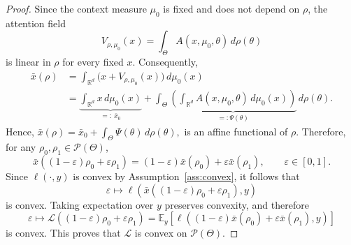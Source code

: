 \documentclass[11pt,a4wide]{article}
\theoremstyle{definition}
\newcommand{\R}{\mathbb{R}}
\newcommand{\Prob}{\mathcal{P}}
\begin{document}
\begin{proof}

Since the context measure $\mu_0$ is fixed and does not depend on $\rho$, the attention field
\[
V_{\rho,\mu_0}(x)
=
\int_\Theta A(x,\mu_0,\theta)\,d\rho(\theta)
\]
is  linear in $\rho$ for every fixed $x$. Consequently,
\[
\begin{aligned}
\bar x(\rho)
&=
\int_{\mathbb R^d}
\bigl(x+V_{\rho,\mu_0}(x)\bigr)
\,d\mu_0(x) \\
&=
\underbrace{\int_{\mathbb R^d}x\,d\mu_0(x)}_{=:~\bar x_0}
+
\int_\Theta
\underbrace{\left(
\int_{\mathbb R^d}
A(x,\mu_0,\theta)\,d\mu_0(x)
\right)}_{=:\Psi(\theta)}
\,d\rho(\theta).
\end{aligned}
\]
Hence, $
\bar x(\rho)
=
\bar x_0
+
\int_\Theta\Psi(\theta)\,d\rho(\theta),
$ is an affine functional of $\rho$. Therefore, for any $\rho_0,\rho_1\in\Prob(\Theta)$,
\[
\bar x\!\left((1-\varepsilon)\rho_0+\varepsilon\rho_1\right)
=
(1-\varepsilon)\bar x(\rho_0)
+
\varepsilon\bar x(\rho_1),
\qquad
\varepsilon\in[0,1].
\]
Since $\ell(\cdot,y)$ is convex by Assumption~\ref{ass:convex}, it follows that
\[
\varepsilon
\longmapsto
\ell\!\left(
\bar x\!\left((1-\varepsilon)\rho_0+\varepsilon\rho_1\right),
y
\right)
\]
is convex. Taking expectation over $y$ preserves convexity, and therefore
\[
\varepsilon
\longmapsto
\mathcal L\!\left(
(1-\varepsilon)\rho_0+\varepsilon\rho_1
\right)
=
\mathbb E_y
\left[
\ell\!\left(
(1-\varepsilon)\bar x(\rho_0)
+\varepsilon\bar x(\rho_1),
y
\right)
\right]
\]
is convex. This proves that $\mathcal L$ is convex on $\Prob(\Theta)$.
\end{proof}
\end{document}
